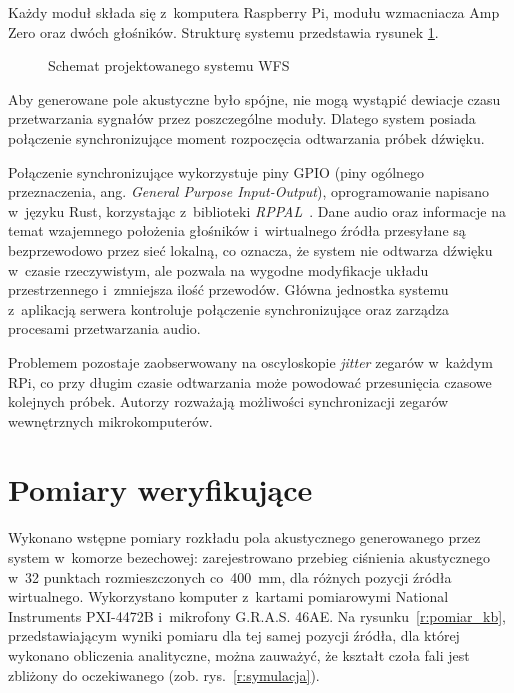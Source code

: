 \documentclass[10pt, a4paper]{article}
\let\Oldsection\section
\renewcommand{\section}{\FloatBarrier\Oldsection}
\begin{document}
Każdy moduł składa się z~komputera Raspberry Pi, modułu wzmacniacza Amp Zero
oraz dwóch głośników. 
Strukturę systemu przedstawia rysunek \ref{fig:schemat}.

\begin{figure}[!tbh]
  \centering
  \caption{Schemat projektowanego systemu WFS}
  \label{fig:schemat}
\end{figure}

Aby generowane pole akustyczne było spójne, nie mogą wystąpić dewiacje czasu
przetwarzania sygnałów przez poszczególne moduły. Dlatego system posiada połączenie
synchronizujące moment rozpoczęcia odtwarzania próbek dźwięku.

Połączenie synchronizujące wykorzystuje piny GPIO (piny ogólnego przeznaczenia, ang.
\textit{General Purpose Input-Output}), oprogramowanie napisano w~języku 
Rust, korzystając z~biblioteki 
\emph{RPPAL}~\cite{RPPAL}. Dane audio oraz informacje na temat wzajemnego położenia 
głośników i~wirtualnego źródła przesyłane są bezprzewodowo przez sieć lokalną, co
oznacza, że system nie odtwarza dźwięku w~czasie rzeczywistym, ale
pozwala na wygodne modyfikacje układu przestrzennego i~zmniejsza ilość
przewodów. Główna jednostka systemu z~aplikacją serwera kontroluje połączenie
synchronizujące oraz zarządza procesami przetwarzania audio.

Problemem pozostaje zaobserwowany na oscyloskopie \textit{jitter} zegarów w~każdym RPi,
co przy długim czasie odtwarzania może powodować przesunięcia czasowe kolejnych próbek.
Autorzy rozważają możliwości synchronizacji zegarów wewnętrznych mikrokomputerów.

\section{Pomiary weryfikujące}

Wykonano wstępne pomiary rozkładu pola akustycznego generowanego przez system 
w~komorze bezechowej: zarejestrowano przebieg ciśnienia akustycznego w~32 punktach 
rozmieszczonych co~\SI{400}{\milli\metre}, dla różnych pozycji źródła wirtualnego.
Wykorzystano komputer z~kartami pomiarowymi National Instruments PXI-4472B i~mikrofony
G.R.A.S. 46AE.
Na rysunku~\ref{r:pomiar_kb}, przedstawiającym wyniki pomiaru dla tej samej pozycji 
źródła, dla której wykonano obliczenia analityczne, można zauważyć,
że kształt czoła fali jest zbliżony do oczekiwanego (zob. rys.~\ref{r:symulacja}).
\end{document}
